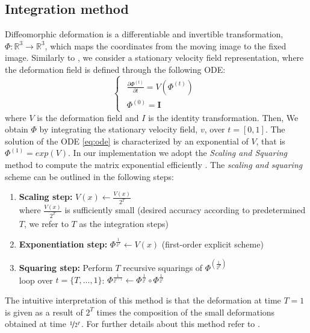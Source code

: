 \documentclass[preprint,authoryear]{elsarticle}
\begin{document}
\subsection{Integration method} \label{subsec:intlayer}
Diffeomorphic deformation is a differentiable and invertible transformation, $\Phi:\mathbb{R}^3\rightarrow \mathbb{R}^3$, which maps the coordinates from the moving image to the fixed image. Similarly to \cite{dalca2018varreg}, we consider a stationary velocity field representation, where 
the deformation field is defined through the following ODE:
\begin{equation}
    \begin{cases}
    \begin{array}{c}
    \frac{\partial\Phi^{(t)}}{\partial t}=V(\Phi^{(t)})\\
    \Phi^{(0)}=\boldsymbol{I}
    \end{array}\end{cases} \label{eq:ode}
\end{equation}
where $V$ is the deformation field and $I$ is the identity transformation. Then, We obtain $\Phi$ by integrating the stationary velocity field, $v$, over $t=\left[0,1\right]$. The solution of the ODE \eqref{eq:ode} is characterized by an exponential of $V$, that is  $\Phi^{(1)}=exp(V)$. In our implementation we adopt the \textit{Scaling and Squaring} method to compute the matrix exponential efficiently \cite{arsigny2006log}. The \textit{scaling and squaring} scheme can be outlined in the following steps:
\begin{enumerate}
    \item  \textbf{Scaling step:} $V(x) \leftarrow \frac{V(x)}{2^T}$ \\
    where $\frac{V(x)}{2^T}$ is sufficiently small (desired accuracy according to predetermined $T$, we refer to $T$ as the integration steps) 
    \item  \textbf{Exponentiation step:} $\Phi^{\frac{1}{2^T}}\leftarrow V(x)$ (first-order explicit scheme)
    \item \textbf{Squaring step:} Perform $T$ recursive squarings of $\Phi^{(\frac{1}{2^T})}$\\
    loop over $t=\{T,...,1\}$: $\Phi^{\frac{1}{2^{t-1}}} \leftarrow \Phi^{\frac{1}{2^t}} \circ \Phi^{\frac{1}{2^t}}$
\end{enumerate}
The intuitive interpretation of this method is that the deformation at time $T=1$ is given as a result of
$2^T$ times the composition of the small deformations obtained at time $\nicefrac{1}{2^T}$. For further details about this method refer to \cite{arsigny2006log}.
\end{document}
